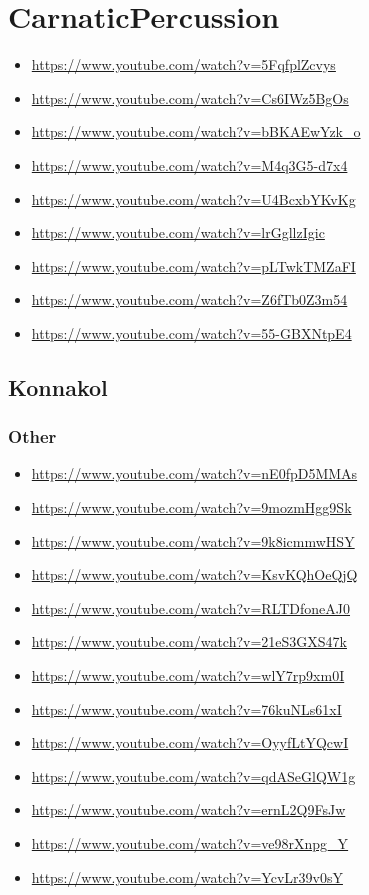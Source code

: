 \section{CarnaticPercussion}
\label{sec:orgf765fdb}
\begin{itemize}
\item \url{https://www.youtube.com/watch?v=5FqfplZcvys}
\item \url{https://www.youtube.com/watch?v=Cs6IWz5BgOs}
\item \url{https://www.youtube.com/watch?v=bBKAEwYzk\_o}
\item \url{https://www.youtube.com/watch?v=M4q3G5-d7x4}
\item \url{https://www.youtube.com/watch?v=U4BcxbYKvKg}
\item \url{https://www.youtube.com/watch?v=lrGgllzIgic}
\item \url{https://www.youtube.com/watch?v=pLTwkTMZaFI}
\item \url{https://www.youtube.com/watch?v=Z6fTb0Z3m54}
\item \url{https://www.youtube.com/watch?v=55-GBXNtpE4}
\end{itemize}

\subsection{Konnakol}
\label{sec:org1f5ab6b}

\subsubsection{Other}
\label{sec:org4647110}
\begin{itemize}
\item \url{https://www.youtube.com/watch?v=nE0fpD5MMAs}
\item \url{https://www.youtube.com/watch?v=9mozmHgg9Sk}
\item \url{https://www.youtube.com/watch?v=9k8icmmwHSY}
\item \url{https://www.youtube.com/watch?v=KsvKQhOeQjQ}
\item \url{https://www.youtube.com/watch?v=RLTDfoneAJ0}
\item \url{https://www.youtube.com/watch?v=21eS3GXS47k}
\item \url{https://www.youtube.com/watch?v=wlY7rp9xm0I}
\item \url{https://www.youtube.com/watch?v=76kuNLs61xI}
\item \url{https://www.youtube.com/watch?v=OyyfLtYQcwI}
\item \url{https://www.youtube.com/watch?v=qdASeGlQW1g}
\item \url{https://www.youtube.com/watch?v=ernL2Q9FsJw}
\item \url{https://www.youtube.com/watch?v=ve98rXnpg\_Y}
\item \url{https://www.youtube.com/watch?v=YcvLr39v0sY}
\end{itemize}

